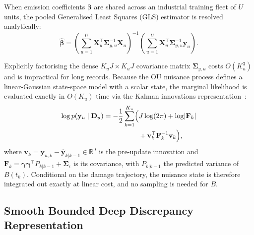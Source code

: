 \documentclass[a4paper,fleqn]{cas-dc}
\newcommand{\R}{\mathbb{R}}
\begin{document}
When emission coefficients $\boldsymbol{\beta}$ are shared across an industrial training fleet of $U$ units, the pooled Generalised Least Squares (GLS) estimator is resolved analytically:
\begin{equation}
    \hat{\boldsymbol{\beta}} = \left(\sum_{u=1}^U \mathbf{X}_u^\top \boldsymbol{\Sigma}_{y,u}^{-1} \mathbf{X}_u\right)^{-1} \left(\sum_{u=1}^U \mathbf{X}_u^\top \boldsymbol{\Sigma}_{y,u}^{-1} \mathbf{y}_u\right).
    \label{eq:gls_solution}
\end{equation}

Explicitly factorising the dense $K_u J \times K_u J$ covariance matrix $\boldsymbol{\Sigma}_{y,u}$ costs $O(K_u^3)$ and is impractical for long records. Because the OU nuisance process defines a linear-Gaussian state-space model with a scalar state, the marginal likelihood is evaluated exactly in $O(K_u)$ time via the Kalman innovations representation~\cite{Durbin_2012}:
\begin{equation}
\begin{aligned}
    \log p(\mathbf{y}_u \mid \mathbf{D}_u) = -\frac{1}{2}\sum_{k=1}^{K_u} \Bigl(&J\log(2\pi) + \log\lvert\mathbf{F}_k\rvert\\
    &+ \mathbf{v}_k^\top \mathbf{F}_k^{-1} \mathbf{v}_k\Bigr),
\end{aligned}
    \label{eq:kalman_innovations}
\end{equation}
where $\mathbf{v}_k = \mathbf{y}_{u,k} - \hat{\mathbf{y}}_{k|k-1} \in \R^J$ is the pre-update innovation and $\mathbf{F}_k = \boldsymbol{\gamma}\boldsymbol{\gamma}^\top P_{k|k-1} + \boldsymbol{\Sigma}_\epsilon$ is its covariance, with $P_{k|k-1}$ the predicted variance of $B(t_k)$. Conditional on the damage trajectory, the nuisance state is therefore integrated out exactly at linear cost, and no sampling is needed for $B$.

\subsection{Smooth Bounded Deep Discrepancy Representation}
\label{subsec:deep_discrepancy}
\end{document}
